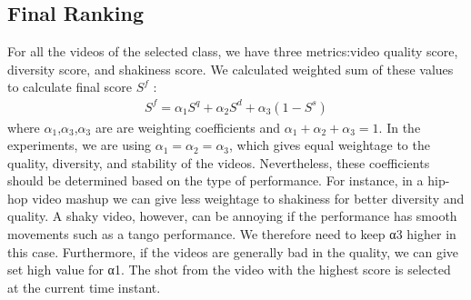 \documentclass{sig-alternate}
\begin{document}
    \subsection{Final Ranking}
    For all the videos of the selected class, we have three metrics:video quality score, diversity score, and shakiness score. We calculated weighted sum of these values to calculate final score $S^f$ :
    \begin{align}
        S^f = \alpha_1S^q + \alpha_2S^d +\alpha_3(1-S^s)
    \end{align}
    where $\alpha_1$,$\alpha_3$,$\alpha_3$ are are weighting coefficients and $\alpha_1+\alpha_2+\alpha_3 = 1$. In the experiments, we are using $\alpha_1 = \alpha_2 = \alpha_3$, which gives equal weightage to the quality, diversity, and stability of the videos. Nevertheless, these coefficients should be determined based on the type of performance. For instance, in a hip-hop video mashup we can give less weightage to shakiness for better diversity and quality. A shaky video, however, can be annoying if the performance has smooth movements such as a tango performance. We therefore need to keep α3 higher in this case. Furthermore, if the videos are generally bad in the quality, we can give set high value for α1. The shot from the video with the highest score is selected at the current time instant.
\end{document}
